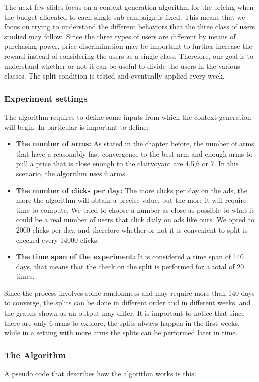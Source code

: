 The next few slides focus on a context generation algorithm for the pricing when the budget allocated to each single sub-campaign is fixed. This means that we focus on trying to understand the different behaviors that the three class of users studied may follow. Since the three types of users are different by means of purchasing power, price discrimination may be important to further increase the reward instead of considering the users as a single class. Therefore, our goal is to understand whether or not it can be useful to divide the users in the various classes. The split condition is tested and eventually applied every week.
\subsubsection{Experiment settings}
The algorithm requires to define some inputs from which the context generation will begin. In particular is important to define:
\begin{itemize}
	\item \textbf{The number of arms:} As stated in the chapter before, the number of arms that have a reasonably fast convergence to the best arm and enough arms to pull a price that is close enough to the clairvoyant are 4,5,6 or 7. In this scenario, the algorithm uses 6 arms.
	\item \textbf{The number of clicks per day:} The more clicks per day on the ads, the more the algorithm will obtain a precise value, but the more it will require time to compute. We tried to choose a number as close as possible to what it could be a real number of users that click daily on ads like ours. We opted to 2000 clicks per day, and therefore whether or not it is convenient to split is checked every 14000 clicks.
	\item \textbf{The time span of the experiment:} It is considered a time span of 140 days, that means that the check on the split is performed for a total of 20 times.
\end{itemize}
Since the process involves some randomness and may require more than 140 days to converge, the splits can be done in different order and in different weeks, and the graphs shown as an output may differ. It is important to notice that since there are only 6 arms to explore, the splits always happen in the first weeks, while in a setting with more arms the splits can be performed later in time.
\subsubsection{The Algorithm}
A pseudo code that describes how the algorithm works is this:\\

